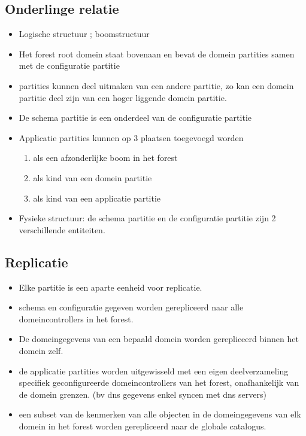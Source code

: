 \subsection{Onderlinge relatie}
\begin{itemize}
\item Logische structuur ; boomstructuur
\item Het forest root domein staat bovenaan en bevat de domein partities samen met de configuratie partitie
\item partities kunnen deel uitmaken van een andere partitie, zo kan een domein partitie deel zijn van een hoger liggende domein partitie.
\item De schema partitie is een onderdeel van de configuratie partitie
\clearpage
\item Applicatie partities kunnen op 3 plaatsen toegevoegd worden
\begin{enumerate}
\item als een afzonderlijke boom in het forest
\item als kind van een domein partitie
\item als kind van een applicatie partitie
\end{enumerate}
\item Fysieke structuur: de schema partitie en de configuratie partitie zijn 2 verschillende entiteiten.
\end{itemize}

\subsection{Replicatie}
\begin{itemize}
\item Elke partitie is een aparte eenheid voor replicatie.
\item schema en configuratie gegeven worden gerepliceerd naar alle domeincontrollers in het forest. 
\item De domeingegevens van een bepaald domein worden gerepliceerd binnen het domein zelf.
\item de applicatie partities worden uitgewisseld met een eigen deelverzameling specifiek geconfigureerde domeincontrollers van het forest, onafhankelijk van de domein grenzen. (bv dns gegevens enkel syncen met dns servers)
\item een subset van de kenmerken van alle objecten in de domeingegevens van elk domein in het forest worden gerepliceerd naar de globale catalogus.
\end{itemize}